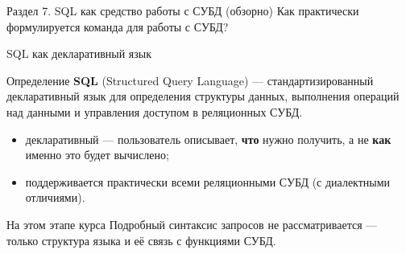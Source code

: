 \documentclass[aspectratio=169]{beamer}
\begin{document}

\begin{frame}{Раздел 7. SQL как средство работы с СУБД (обзорно)}
\centering
\Large
Как практически формулируется команда для работы с СУБД?
\end{frame}


\begin{frame}{SQL как декларативный язык}

\begin{block}{Определение}
\textbf{SQL} (Structured Query Language) — стандартизированный
декларативный язык для определения структуры данных,
выполнения операций над данными и управления доступом
в реляционных СУБД.
\end{block}

\vspace{0.3cm}

\begin{itemize}
  \item декларативный — пользователь описывает,
        \textbf{что} нужно получить, а не \textbf{как} именно
        это будет вычислено;
  \item поддерживается практически всеми реляционными СУБД
        (с диалектными отличиями).
\end{itemize}

\vspace{0.3cm}

\begin{alertblock}{На этом этапе курса}
Подробный синтаксис запросов не рассматривается —
только структура языка и её связь с функциями СУБД.
\end{alertblock}

\end{frame}
\end{document}
